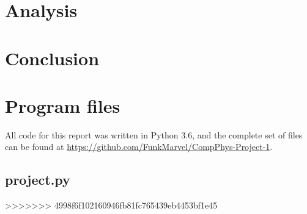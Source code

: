 \documentclass[english,notitlepage]{revtex4-1}  %
\begin{document}
\section{Analysis}\label{sec:4}

\section{Conclusion}\label{sec:5}

\appendix
\section{Program files} \label{A:1}
All code for this report was written in Python 3.6, and the complete set of files can be found at \url{https://github.com/FunkMarvel/CompPhys-Project-1}.
\subsection{project.py}\label{A:11}
>>>>>>> 4998f6f102160946fb81fc765439eb4453bf1e45
\end{document}
